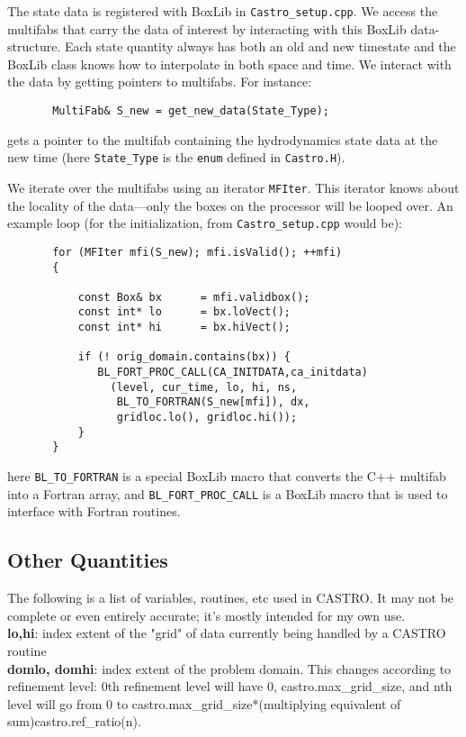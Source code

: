 The state data is registered with BoxLib in {\tt Castro\_setup.cpp}.  We access 
the multifabs that carry the data of interest by interacting with this
BoxLib data-structure.  Each state quantity always has both an old and new timestate
and the BoxLib class knows how to interpolate in both space and time.  We interact
with the data by getting pointers to multifabs.  For instance:
\begin{verbatim}
       MultiFab& S_new = get_new_data(State_Type);
\end{verbatim}
gets a pointer to the multifab containing the hydrodynamics state data
at the new time (here {\tt State\_Type} is the {\tt enum} defined in 
{\tt Castro.H}).

We iterate over the multifabs using an iterator {\tt MFIter}.  This
iterator knows about the locality of the data---only the boxes on the
processor will be looped over.  An example loop (for the
initialization, from {\tt Castro\_setup.cpp} would be):
\begin{verbatim}
       for (MFIter mfi(S_new); mfi.isValid(); ++mfi)
       {

           const Box& bx      = mfi.validbox();
           const int* lo      = bx.loVect();
           const int* hi      = bx.hiVect();

           if (! orig_domain.contains(bx)) {
              BL_FORT_PROC_CALL(CA_INITDATA,ca_initdata)
                (level, cur_time, lo, hi, ns,
                 BL_TO_FORTRAN(S_new[mfi]), dx,
                 gridloc.lo(), gridloc.hi());
           }
       }
\end{verbatim}
here {\tt BL\_TO\_FORTRAN} is a special BoxLib macro that converts the
C++ multifab into a Fortran array, and {\tt BL\_FORT\_PROC\_CALL}
is a BoxLib macro that is used to interface with Fortran routines.

\subsection{Other Quantities}

The following is a list of variables, routines, etc used in CASTRO. It
may not be complete or even entirely accurate; it's mostly intended
for my own use.\\

{\bf lo,hi}: index extent of the "grid" of data currently being
handled by a CASTRO routine\\

{\bf domlo, domhi}: index extent of the problem domain. This changes
according to refinement level: 0th refinement level will have 0,
castro.max\_grid\_size, and nth level will go from 0 to
castro.max\_grid\_size*(multiplying equivalent of
sum)castro.ref\_ratio(n).\\

